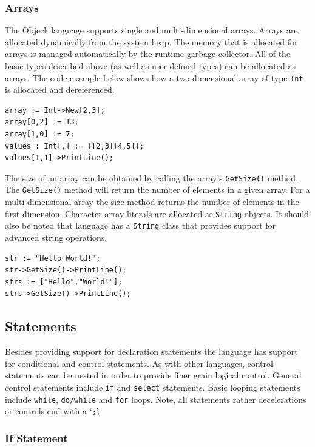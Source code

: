 \documentclass[12pt]{article}
\begin{document}
\subsubsection{Arrays}
The Objeck language supports single and multi-dimensional arrays.  Arrays are allocated dynamically from the system heap.  The memory that is allocated for arrays is managed automatically by the runtime garbage collector.  All of the basic types described above (as well as user defined types) can be allocated as arrays.  The code example below shows how a two-dimensional array of type \texttt{Int} is allocated and dereferenced.


\begin{verbatim}
array := Int->New[2,3];
array[0,2] := 13;
array[1,0] := 7;
values : Int[,] := [[2,3][4,5]];
values[1,1]->PrintLine();
\end{verbatim}

The size of an array can be obtained by calling the array's \texttt{GetSize()} method.  The \texttt{GetSize()} method will return the number of elements in a given array.  For a multi-dimensional array the size method returns the number of elements in the first dimension.  Character array literals are allocated as \texttt{String} objects.  It should also be noted that language has a \texttt{String} class that provides support for advanced string operations.

\begin{verbatim}
str := "Hello World!";
str->GetSize()->PrintLine();
strs := ["Hello","World!"];
strs->GetSize()->PrintLine();
\end{verbatim}

\subsection{Statements}
Besides providing support for declaration statements the language has support for conditional and control statements.  As with other languages, control statements can be nested in order to provide finer grain logical control. General control statements include \texttt{if} and \texttt{select} statements. Basic looping statements include \texttt{while}, \texttt{do/while} and \texttt{for} loops.  Note, all statements rather decelerations or controls end with a `\texttt{;}'.

\subsubsection{If Statement}
\end{document}
